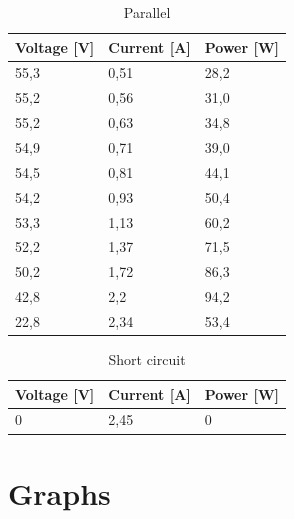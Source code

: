 \documentclass[12pt]{article}
\begin{document}
\begin{table}[!h]
	\centering
	\begin{tabular}{|p{2cm}|p{2cm}|p{2cm}|}
		\hline
		\rowcolor{RedOrange!80} Voltage [V] & Current [A] & Power [W] \\
		\hline
		\rowcolor{Peach!70}   55,3          & 0,51        & 28,2      \\
		\hline
		\rowcolor{Melon!70}     55,2        & 0,56        & 31,0      \\
		\hline
		\rowcolor{Peach!70}      55,2       & 0,63        & 34,8      \\
		\hline
		\rowcolor{Melon!70}        54,9     & 0,71        & 39,0      \\
		\hline
		\rowcolor{Peach!70}        54,5     & 0,81        & 44,1      \\
		\hline
		\rowcolor{Melon!70}    54,2         & 0,93        & 50,4      \\
		\hline
		\rowcolor{Peach!70}    53,3         & 1,13        & 60,2      \\
		\hline
		\rowcolor{Melon!70}     52,2        & 1,37        & 71,5      \\
		\hline
		\rowcolor{Peach!70}      50,2       & 1,72        & 86,3      \\
		\hline
		\rowcolor{Melon!70}       42,8      & 2,2         & 94,2      \\
		\hline
		\rowcolor{Peach!70}        22,8     & 2,34        & 53,4      \\
		\hline
	\end{tabular}
	\caption{Parallel}
	\label{tab:my_label}
\end{table}

\begin{table}[!h]
	\centering
	\begin{tabular}{|p{2cm}|p{2cm}|p{2cm}|}
		\hline
		\rowcolor{Red!80} Voltage [V] & Current [A] & Power [W] \\
		\hline
		\rowcolor{Red!60} 0           & 2,45        & 0         \\
		\hline
	\end{tabular}
	\caption{Short circuit}
	\label{tab:my_label}
\end{table}
\clearpage
\section{Graphs}
\end{document}
